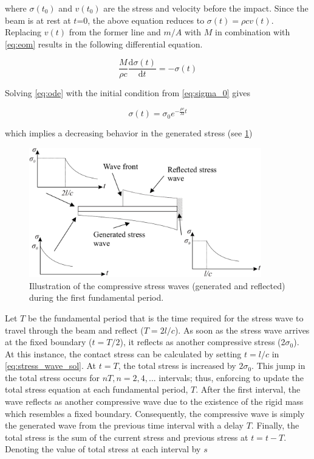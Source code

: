\documentclass{article}
\begin{document}
where $\sigma(t_0)$ and $v(t_0)$ are the stress and velocity before the impact. Since the beam is at rest at $t$=0, the above equation reduces to $\sigma(t) = \rho c v(t)$. Replacing $v(t)$ from the former line and $m/A$ with $M$ in combination with \cref{eq:eom} results in the following differential equation.

\begin{equation}
    \frac{M}{\rho c} \frac{\text{d} \sigma(t)}{\text{d} t} = -\sigma(t)
    \label{eq:ode}
\end{equation}

Solving \cref{eq:ode} with the initial condition from \cref{eq:sigma_0} gives

\begin{equation}
    \sigma(t) = \sigma_0 e^{-\textstyle\frac{\rho c}{M}t}
    \label{eq:stress_wave_sol}
\end{equation}

which implies a decreasing behavior in the generated stress (see \cref{fig:stress_wave_schematic}) \\

\begin{figure}[ht]
    \centering
    \includegraphics[width = 0.9\textwidth ]{figures/stress_wave_schematic.pdf}
    \caption{Illustration of the compressive stress waves (generated and reflected) during the first fundamental period.}
    \label{fig:stress_wave_schematic}
\end{figure}

Let $T$ be the fundamental period that is the time required for the stress wave to travel through the beam and reflect ($T=2l/c$). As soon as the stress wave arrives at the fixed boundary ($t=T/2$), it reflects as another compressive stress (2$\sigma_0$). At this instance, the contact stress can be calculated by setting $t=l/c$ in \cref{eq:stress_wave_sol}. At $t=T$, the total stress is increased by $2\sigma_0$. This jump in the total stress occurs for $nT, n = 2, 4 , ...$ intervals; thus, enforcing to update the total stress equation at each fundamental period, $T$. After the first interval, the wave reflects as another compressive wave due to the existence of the rigid mass which resembles a fixed boundary. Consequently, the compressive wave is simply the generated wave from the previous time interval with a delay $T$. Finally, the total stress is the sum of the current stress and previous stress at $t=t-T$. Denoting the value of total stress at each interval by $s$ 
\end{document}
